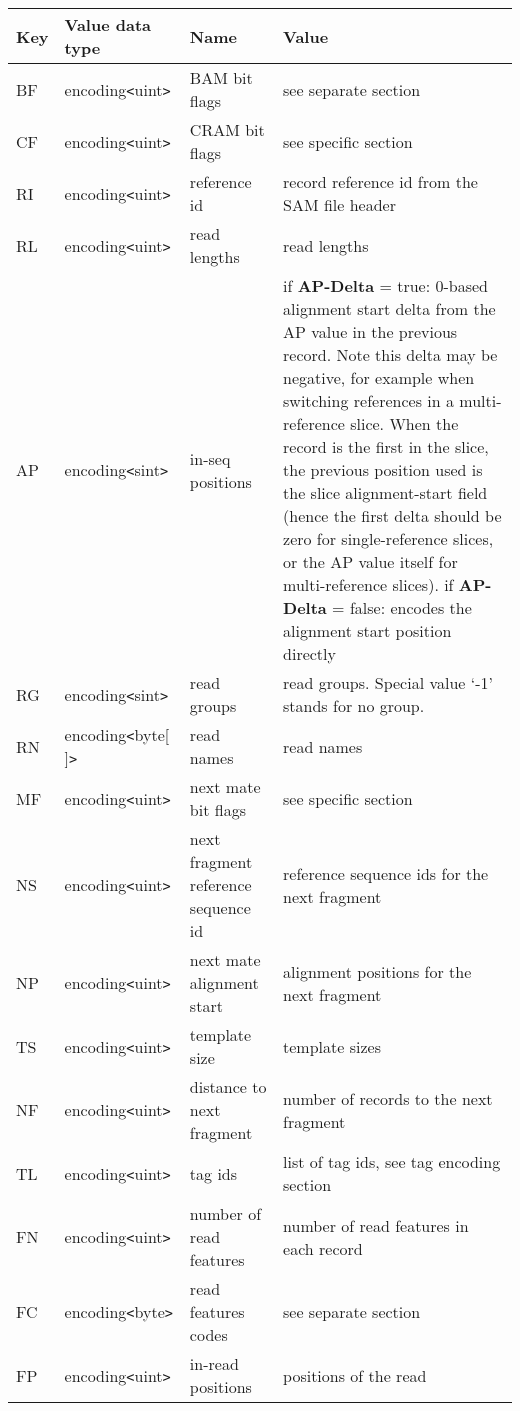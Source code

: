 \documentclass[a4paper]{article}
\begin{document}
\begin{threeparttable}[t]
\begin{tabular}{|l|l|>{\raggedright}p{100pt}|>{\raggedright}p{220pt}|}
\hline
\textbf{Key} & \textbf{Value data type} & \textbf{Name} & \textbf{Value}\tabularnewline
\hline
BF & encoding\texttt{<}uint\texttt{>} & BAM bit flags & see separate section\tabularnewline
\hline
CF & encoding\texttt{<}uint\texttt{>} & CRAM bit flags & see specific section\tabularnewline
\hline
RI & encoding\texttt{<}uint\texttt{>} & reference id & record reference id from
the SAM file header\tabularnewline
\hline
RL & encoding\texttt{<}uint\texttt{>} & read lengths & read lengths\tabularnewline
\hline
AP & encoding\texttt{<}sint\texttt{>} & in-seq positions & if \textbf{AP-Delta} = true: 0-based alignment start
delta from the AP value in the previous record.
Note this delta may be negative, for example when switching references in a multi-reference slice.
When the record is the first in the slice, the previous position used is the slice alignment-start field (hence the first delta should be zero for single-reference slices, or the AP value itself for multi-reference slices).  \linebreak{}
if \textbf{AP-Delta} = false: encodes the alignment start position directly\tabularnewline
\hline
RG & encoding\texttt{<}sint\texttt{>} & read groups & read groups. Special value 
`-1' stands for no group.\tabularnewline
\hline
RN\tnote{a} & encoding\texttt{<}byte[ ]\texttt{>} & read names & read names\tabularnewline
\hline
MF & encoding\texttt{<}uint\texttt{>} & next mate bit flags & see specific section\tabularnewline
\hline
NS & encoding\texttt{<}uint\texttt{>} & next fragment reference sequence id & reference 
sequence ids for the next fragment \tabularnewline
\hline
NP & encoding\texttt{<}uint\texttt{>} & next mate alignment start & alignment positions 
for the next fragment\tabularnewline
\hline
TS & encoding\texttt{<}uint\texttt{>} & template size & template sizes\tabularnewline
\hline
NF & encoding\texttt{<}uint\texttt{>} & distance to next fragment & number of records
to the next fragment\tnote{b}\tabularnewline
\hline
TL\tnote{c} & encoding\texttt{<}uint\texttt{>} & tag ids  & list of tag ids, see tag encoding
section\tabularnewline
\hline
FN & encoding\texttt{<}uint\texttt{>} & number of read features & number of read
features in each record\tabularnewline
\hline
FC & encoding\texttt{<}byte\texttt{>} & read features codes & see separate section\tabularnewline
\hline
FP & encoding\texttt{<}uint\texttt{>} & in-read positions & positions of the read

\end{tabular}
\end{threeparttable}
\end{document}

